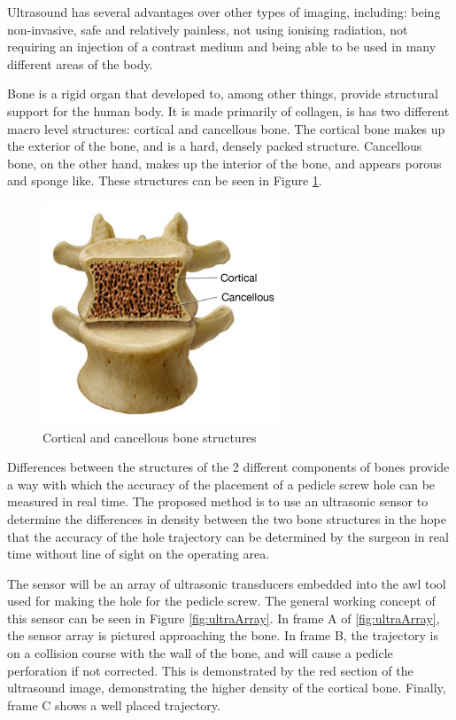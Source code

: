 \documentclass[conference, a4paper]{IEEEtran}
\begin{document}
Ultrasound has several advantages over other types of imaging, including:
being non-invasive, safe and relatively painless, not using ionising radiation,
not requiring an injection of a contrast medium and being able to be used in
many different areas of the body\cite{imagingExplained}. 

Bone is a rigid organ that developed to, among other things, 
provide structural support for the human body. It is made primarily of
collagen, is has two different macro level structures: cortical and cancellous 
bone. The cortical bone makes up the exterior of the bone, and is a hard, 
densely packed structure. Cancellous bone, on the other hand, makes up the
interior of the bone, and appears porous and sponge like\cite{Rho1998}. These structures
can be seen in Figure \ref{fig:boneStruct}.

\begin{figure}
	\centering
	\includegraphics{assets/boneStruct.jpg}
	\caption{Cortical and cancellous bone structures \cite{boneStructure}}
	\label{fig:boneStruct}
\end{figure}

Differences between the structures of the 2 different components of bones
provide a way with which the accuracy of the placement of a pedicle screw hole
can be measured in real time. The proposed method is to use an ultrasonic 
sensor to determine the differences in density between the two bone structures
in the hope that the accuracy of the hole trajectory can be determined by the
surgeon in real time without line of sight on the operating area. 

The sensor will be an array of ultrasonic transducers embedded into the awl
tool used for making the hole for the pedicle screw. The general working
concept of this sensor can be seen in Figure \ref{fig:ultraArray}.
In frame A of \ref{fig:ultraArray}, the sensor array is pictured approaching
the bone. In frame B, the trajectory is on a collision course with the wall 
of the bone, and will cause a pedicle perforation if not corrected. This
is demonstrated by the red section of the ultrasound image, demonstrating 
the higher density of the cortical bone. Finally, frame C shows a well placed
trajectory.
\end{document}
